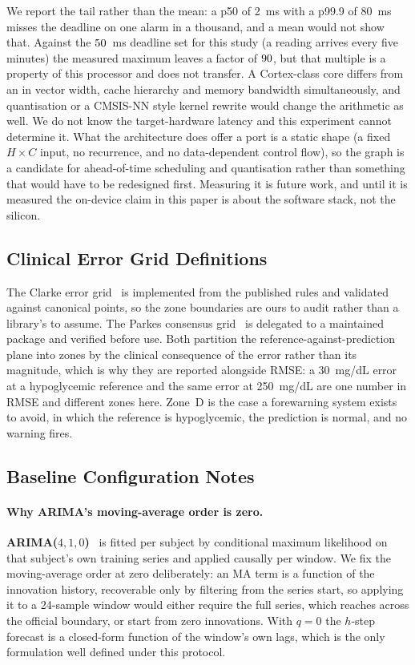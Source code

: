 We report the tail rather than the mean: a p50 of 2~ms with a p99.9 of 80~ms
misses the deadline on one alarm in a thousand, and a mean would not show that. Against the $50$~ms deadline set for this study (a reading
arrives every five minutes) the measured maximum leaves a factor of $90$, but that
multiple is a property of this processor and does not transfer. A Cortex-class
core differs from an \NumEdgeCPU{} in vector width, cache hierarchy and memory
bandwidth simultaneously, and quantisation or a CMSIS-NN style kernel rewrite
would change the arithmetic as well. We do not know the target-hardware latency
and this experiment cannot determine it. What the architecture does offer a port
is a static shape (a fixed $H \times C$ input, no recurrence, and no
data-dependent control flow), so the graph is a candidate for ahead-of-time
scheduling and quantisation rather than something that would have to be
redesigned first. Measuring it is future work, and until it is measured the
on-device claim in this paper is about the software stack, not the silicon.

\subsection{Clinical Error Grid Definitions}
\label{sec:appendix_grids}

The Clarke error grid~\citep{clarke1987evaluating} is implemented from the
published rules and validated against canonical points, so the zone boundaries
are ours to audit rather than a library's to assume. The Parkes consensus
grid~\citep{parkes2000new} is delegated to a maintained package and verified
before use. Both partition the reference-against-prediction plane into zones by
the clinical consequence of the error rather than its magnitude, which is why
they are reported alongside RMSE: a 30~mg/dL error at a hypoglycemic reference
and the same error at 250~mg/dL are one number in RMSE and different zones here.
Zone~D is the case a forewarning system exists to avoid, in which the reference
is hypoglycemic, the prediction is normal, and no warning fires.

\subsection{Baseline Configuration Notes}
\label{sec:appendix_baselines}

\paragraph{Why ARIMA's moving-average order is zero.}
\textbf{ARIMA($4,1,0$)}~\citep{box2015time} is fitted per subject by
conditional maximum likelihood on that subject's own training series and applied
causally per window. We fix the moving-average order at zero deliberately: an MA
term is a function of the innovation history, recoverable only by filtering from
the series start, so applying it to a 24-sample window would either require the
full series, which reaches across the official boundary, or start from zero
innovations. With $q = 0$ the $h$-step forecast is a closed-form function of
the window's own lags, which is the only formulation well defined under this
protocol.
